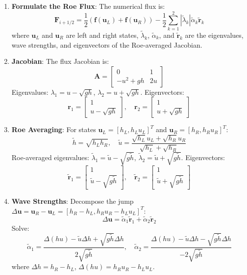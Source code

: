 \documentclass[12pt]{article}
\begin{document}
\begin{enumerate}
    \item \textbf{Formulate the Roe Flux}: The numerical flux is:
    \[
    \mathbf{F}_{i+1/2} = \frac{1}{2} \left( \mathbf{f}(\mathbf{u}_L) + \mathbf{f}(\mathbf{u}_R) \right) - \frac{1}{2} \sum_{k=1}^2 |\tilde{\lambda}_k| \tilde{\alpha}_k \tilde{\mathbf{r}}_k
    \]
    where \(\mathbf{u}_L\) and \(\mathbf{u}_R\) are left and right states, \(\tilde{\lambda}_k\), \(\tilde{\alpha}_k\), and \(\tilde{\mathbf{r}}_k\) are the eigenvalues, wave strengths, and eigenvectors of the Roe-averaged Jacobian.

    \item \textbf{Jacobian}: The flux Jacobian is:
    \[
    \mathbf{A} = \begin{bmatrix} 0 & 1 \\ -u^2 + gh & 2u \end{bmatrix}
    \]
    Eigenvalues: \(\lambda_1 = u - \sqrt{gh}\), \(\lambda_2 = u + \sqrt{gh}\). Eigenvectors:
    \[
    \mathbf{r}_1 = \begin{bmatrix} 1 \\ u - \sqrt{gh} \end{bmatrix}, \quad \mathbf{r}_2 = \begin{bmatrix} 1 \\ u + \sqrt{gh} \end{bmatrix}
    \]

    \item \textbf{Roe Averaging}: For states \(\mathbf{u}_L = [h_L, h_L u_L]^T\) and \(\mathbf{u}_R = [h_R, h_R u_R]^T\):
    \[
    \tilde{h} = \sqrt{h_L h_R}, \quad \tilde{u} = \frac{\sqrt{h_L} u_L + \sqrt{h_R} u_R}{\sqrt{h_L} + \sqrt{h_R}}
    \]
    Roe-averaged eigenvalues: \(\tilde{\lambda}_1 = \tilde{u} - \sqrt{g \tilde{h}}\), \(\tilde{\lambda}_2 = \tilde{u} + \sqrt{g \tilde{h}}\). Eigenvectors:
    \[
    \tilde{\mathbf{r}}_1 = \begin{bmatrix} 1 \\ \tilde{u} - \sqrt{g \tilde{h}} \end{bmatrix}, \quad \tilde{\mathbf{r}}_2 = \begin{bmatrix} 1 \\ \tilde{u} + \sqrt{g \tilde{h}} \end{bmatrix}
    \]

    \item \textbf{Wave Strengths}: Decompose the jump \(\Delta \mathbf{u} = \mathbf{u}_R - \mathbf{u}_L = [h_R - h_L, h_R u_R - h_L u_L]^T\):
    \[
    \Delta \mathbf{u} = \tilde{\alpha}_1 \tilde{\mathbf{r}}_1 + \tilde{\alpha}_2 \tilde{\mathbf{r}}_2
    \]
    Solve:
    \[
    \tilde{\alpha}_1 = \frac{\Delta (hu) - \tilde{u} \Delta h + \sqrt{g \tilde{h}} \Delta h}{2 \sqrt{g \tilde{h}}}, \quad \tilde{\alpha}_2 = \frac{\Delta (hu) - \tilde{u} \Delta h - \sqrt{g \tilde{h}} \Delta h}{-2 \sqrt{g \tilde{h}}}
    \]
    where \(\Delta h = h_R - h_L\), \(\Delta (hu) = h_R u_R - h_L u_L\).


\end{enumerate}
\end{document}
